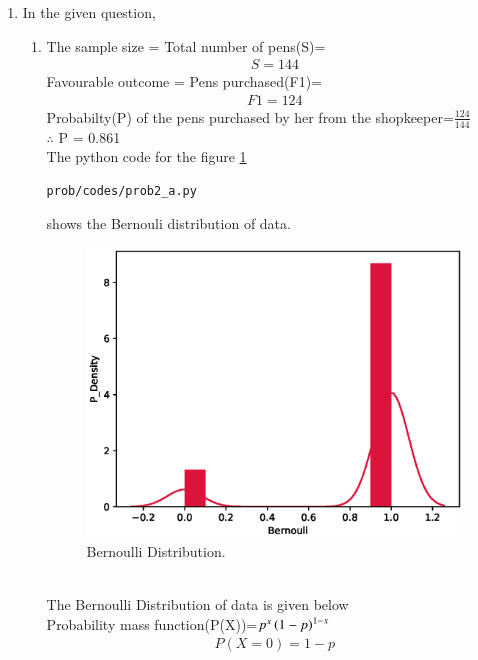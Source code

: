 \renewcommand{\theequation}{\theenumi}
\begin{enumerate}[label=\arabic*.,ref=\thesubsubsection.\theenumi]
\item In the given question,
\\
\begin{enumerate}
\item
The sample size = Total number of pens(S)=
\begin{align}
S=144
\end{align}
Favourable outcome = Pens purchased(F1)=
\begin{align}
F1=124 
\end{align}
Probabilty(P) of the pens purchased by her from the shopkeeper=$\frac{124}{144}$
\\
$\therefore$ P = 0.861
\label{eq:prob}
\\
The python code for the figure \ref{fig:figure1}
\begin{lstlisting}
prob/codes/prob2_a.py
\end{lstlisting}
shows the Bernouli distribution of data.
\begin{figure}[!ht]
\centering
\includegraphics[width=\columnwidth]{./prob/figs/prob2_a.eps}
\caption{Bernoulli Distribution.}
\label{fig:figure1}
\end{figure}
\\
The Bernoulli Distribution of data is given below
\\
Probability mass function(P(X))=$p^x\left(1-p\right)^{1-x}$
\begin{align}
P(X=0)=1-p
\\

\end{align}
\end{enumerate}
\end{enumerate}
